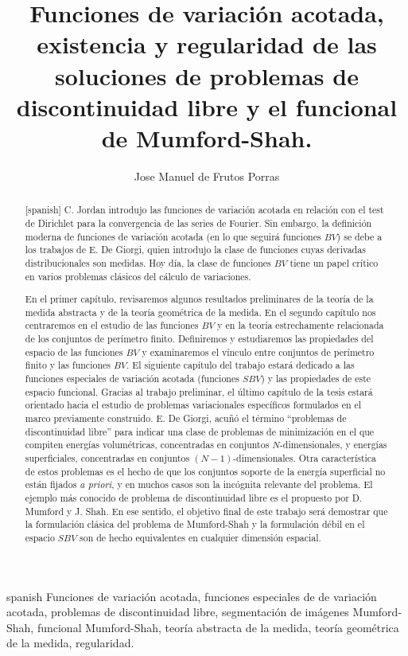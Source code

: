 \documentclass[a4paper,11pt,spanish, twoside, leqno]{tfm-uam}
\title{Funciones de variación acotada, existencia y regularidad de las soluciones de problemas de discontinuidad libre y el funcional de Mumford-Shah.}
\author{Jose Manuel de Frutos Porras}
\begin{document}
\begin{abstract}[spanish]
C. Jordan introdujo las funciones de variación acotada en relación con el test de Dirichlet para la convergencia de las series de Fourier. Sin embargo, la definición moderna de funciones de variación acotada (en lo que seguirá funciones $BV$) se debe a los trabajos de E. De Giorgi, quien introdujo la clase de funciones cuyas derivadas distribucionales son medidas. Hoy día, la clase de funciones $BV$ tiene un papel crítico en varios problemas clásicos del cálculo de variaciones.

En el primer capítulo, revisaremos algunos resultados preliminares de la teoría de la medida abstracta y de la teoría geométrica de la medida. En el segundo capítulo nos centraremos  en el estudio de las funciones $BV$ y en la teoría estrechamente relacionada de los conjuntos de perímetro finito. Definiremos y estudiaremos las propiedades del espacio de las funciones $BV$ y examinaremos el vínculo entre conjuntos de perímetro finito y las funciones $BV$. El siguiente capítulo del trabajo estará dedicado a las funciones especiales de variación acotada (funciones $SBV$) y las propiedades de este espacio funcional. Gracias al trabajo preliminar, el último capítulo de la tesis estará orientado hacia el estudio de problemas variacionales específicos formulados en el marco previamente construido. E. De Giorgi, acuñó el término ``problemas de discontinuidad libre'' para indicar una clase de problemas de minimización en el que compiten energías volumétricas, concentradas en conjuntos $N$-dimensionales, y energías superficiales, concentradas en conjuntos $(N-1)$-dimensionales. Otra característica de estos problemas es el hecho de que los conjuntos soporte de la energía superficial no están fijados \textit{a priori}, y en muchos casos son la incógnita relevante del problema. El ejemplo más conocido de problema de discontinuidad libre es el propuesto por D. Mumford y J. Shah. En ese sentido, el objetivo final de este trabajo será demostrar que la formulación clásica del problema de Mumford-Shah y la formulación débil en el espacio $SBV$ son de hecho equivalentes en cualquier dimensión espacial.
\end{abstract}

\begin{keywords}{spanish}
Funciones de variación acotada, funciones especiales de de variación acotada, problemas de discontinuidad libre, segmentación de imágenes Mumford-Shah, funcional Mumford-Shah, teoría abstracta de la medida, teoría geométrica de la medida, regularidad.
\end{keywords}
\end{document}
